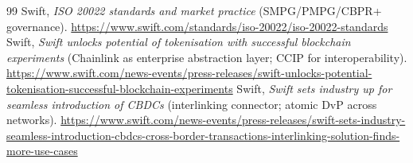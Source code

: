 \documentclass[11pt,a4paper]{article}
\begin{document}
\begin{thebibliography}{99}
 Swift, \emph{ISO 20022 standards and market practice} (SMPG/PMPG/CBPR+ governance). \url{https://www.swift.com/standards/iso-20022/iso-20022-standards}
 Swift, \emph{Swift unlocks potential of tokenisation with successful blockchain experiments} (Chainlink as enterprise abstraction layer; CCIP for interoperability). \url{https://www.swift.com/news-events/press-releases/swift-unlocks-potential-tokenisation-successful-blockchain-experiments}
 Swift, \emph{Swift sets industry up for seamless introduction of CBDCs} (interlinking connector; atomic DvP across networks). \url{https://www.swift.com/news-events/press-releases/swift-sets-industry-seamless-introduction-cbdcs-cross-border-transactions-interlinking-solution-finds-more-use-cases}
\end{thebibliography}
\end{document}
